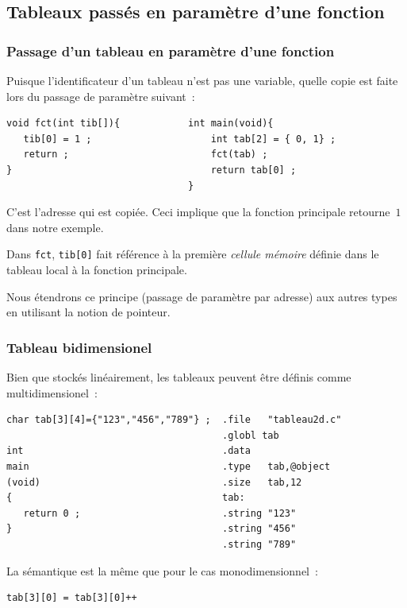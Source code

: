 \begin{frame}[fragile]
  \section{Tableaux pass\'es en param\`etre d'une fonction}%
  \frametitle{Passage d'un tableau en param\`etre d'une fonction}%
  Puisque l'identificateur d'un tableau n'est pas une variable, quelle
  copie est faite lors du passage de param\`etre suivant~:
\begin{verbatim}
void fct(int tib[]){            int main(void){
   tib[0] = 1 ;                     int tab[2] = { 0, 1} ;
   return ;                         fct(tab) ;
}                                   return tab[0] ;   
                                }
\end{verbatim}
  C'est l'adresse qui est copi\'ee. Ceci implique que la fonction
  principale retourne~$1$ dans notre exemple.
  \par\medskip
  Dans \verb?fct?, \verb?tib[0]? fait r\'ef\'erence \`a la premi\`ere
  \textit{cellule m\'emoire} d\'efinie dans le tableau local \`a la
  fonction principale.
  \par\bigskip
  Nous \'etendrons ce principe (passage de param\`etre par adresse)
  aux autres types en utilisant la notion de pointeur.
\end{frame}
\begin{frame}[fragile]
  \frametitle{Tableau bidimensionel}%
  Bien que stock\'es lin\'eairement, les tableaux peuvent \^etre
  d\'efinis comme multidimensionel~:
\begin{verbatim}
char tab[3][4]={"123","456","789"} ;  .file   "tableau2d.c"   
                                      .globl tab                   
int                                   .data                
main                                  .type   tab,@object  
(void)                                .size   tab,12       
{                                     tab:                         
   return 0 ;                         .string "123"        
}                                     .string "456"        
                                      .string "789"        
\end{verbatim}
  La s\'emantique est la m\^eme que pour le cas monodimensionnel~:
\begin{verbatim}
tab[3][0] = tab[3][0]++
\end{verbatim}
\end{frame}
